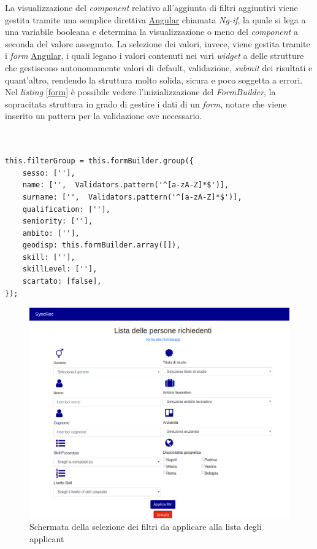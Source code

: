 La visualizzazione del \textit{component} relativo all'aggiunta di filtri aggiuntivi viene gestita tramite una semplice direttiva \hyperref[angular]{Angular} chiamata \textit{Ng-if}, la quale si lega a una variabile booleana e determina la visualizzazione o meno del \textit{component} a seconda del valore assegnato. La selezione dei valori, invece, viene gestita tramite i \textit{form} \hyperref[angular]{Angular}, i quali legano i valori contenuti nei vari \textit{widget} a delle strutture che gestiscono autonomamente valori di default, validazione, \textit{submit} dei risultati e quant'altro, rendendo la struttura molto solida, sicura e poco soggetta a errori.
Nel \textit{listing} \ref{form} è possibile vedere l'inizializzazione del \textit{FormBuilder}, la sopracitata struttura in grado di gestire i dati di un \textit{form}, notare che viene inserito un pattern per la validazione ove necessario.
\newpage
\begin{lstlisting}[label= form, caption= Inizializzazione di un FormBuilder]


this.filterGroup = this.formBuilder.group({
	sesso: [''],
	name: ['',  Validators.pattern('^[a-zA-Z]*$')],
	surname: ['',  Validators.pattern('^[a-zA-Z]*$')],
	qualification: [''],
	seniority: [''],
	ambito: [''],
	geodisp: this.formBuilder.array([]),
	skill: [''],
	skillLevel: [''],
	scartato: [false],
});

\end{lstlisting}

\vspace{0.5em}
\begin{figure}[!h] 
	\centering 
	\includegraphics[width=1\columnwidth]{immagini/svil/filtri} 
	\caption{Schermata della selezione dei filtri da applicare alla lista degli applicant}
	\label{figura:filtri}
\end{figure}

